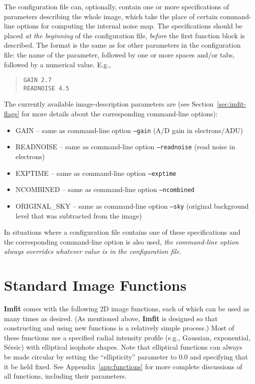 \documentclass[10pt,a4paper,article]{memoir}
\newcommand{\imfit}{\textbf{Imfit}}
\newcommand{\Imfit}{\textbf{Imfit}}
\begin{document}
The configuration file can, optionally, contain one or more specifications of 
parameters describing the whole image, which take the place of certain command-line
options for computing the internal noise map.  The specifications should be placed
\textit{at the beginning} of the configuration file, \textit{before} the first function
block is described. The format is the same as for other parameters in the configuration
file: the name of the parameter, followed by one or more spaces and/or tabs, followed
by a numerical value. E.g.,
\begin{quote}
  \texttt{GAIN  2.7} \\
  \texttt{READNOISE  4.5} \\
\end{quote}

The currently available image-description parameters are (see Section~\ref{sec:imfit-flags} for more
details about the corresponding command-line options):
\begin{itemize}
\item GAIN -- same as command-line option \texttt{--gain} (A/D gain in electrons/ADU)
\item READNOISE -- same as command-line option \texttt{--readnoise} (read noise in electrons)
\item EXPTIME -- same as command-line option \texttt{--exptime}
\item NCOMBINED -- same as command-line option \texttt{--ncombined}
\item ORIGINAL\_SKY -- same as command-line option \texttt{--sky} (original
background level that was subtracted from the image)
\end{itemize}

In situations where a configuration file contains one of these specifications
and the corresponding command-line option is also used, \textit{the command-line option
always overrides whatever value is  in the configuration file.}



\newpage

\chapter{Standard Image Functions}

\Imfit{} comes with the following 2D image functions, each of
which can be used as many times as desired. (As mentioned above, \imfit{}
is designed so that constructing and using new functions is a relatively
simple process.) Most of these functions use a specified radial intensity
profile (e.g., Gaussian, exponential, S{\'e}rsic) with elliptical isophote
shapes. Note that elliptical functions can always be made circular
by setting the ``ellipticity'' parameter to 0.0 and specifying that it be
held fixed. See Appendix~\ref{app:functions} for more complete discussions of all
functions, including their parameters.
\end{document}
